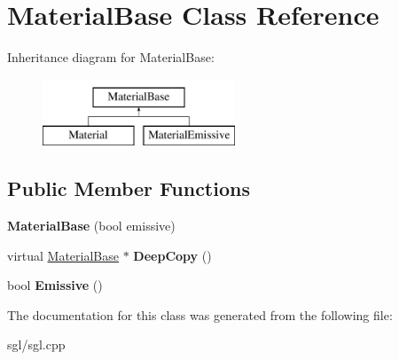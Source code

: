 \hypertarget{class_material_base}{}\section{Material\+Base Class Reference}
\label{class_material_base}
Inheritance diagram for Material\+Base\+:\begin{figure}[H]
\begin{center}
\leavevmode
\includegraphics[height=2.000000cm]{class_material_base}
\end{center}
\end{figure}
\subsection*{Public Member Functions}
\begin{DoxyCompactItemize}
\item 
\mbox{\label{class_material_base_a671519f0b0f36693096d8bec28ed49d8}} 
{\bfseries Material\+Base} (bool emissive)
\item 
\mbox{\label{class_material_base_a849fa0f00856923bc9585560fc7cc2c7}} 
virtual \hyperlink{class_material_base}{Material\+Base} $\ast$ {\bfseries Deep\+Copy} ()
\item 
\mbox{\label{class_material_base_aacb0919ed97bec129b4d8c04bc23480e}} 
bool {\bfseries Emissive} ()
\end{DoxyCompactItemize}


The documentation for this class was generated from the following file\+:\begin{DoxyCompactItemize}
\item 
sgl/sgl.\+cpp\end{DoxyCompactItemize}
